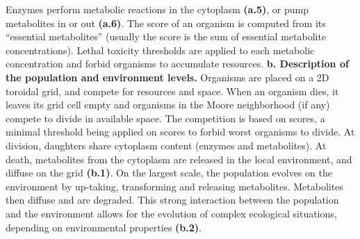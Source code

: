 \begin{figurehere}
{{Enzymes perform metabolic reactions in the cytoplasm \textbf{(a.5)}, or pump metabolites in or out \textbf{(a.6)}. The score of an organism is computed from its ``essential metabolites''
(usually the score is the sum of essential metabolite concentrations). Lethal toxicity thresholds are applied to each metabolic concentration and forbid organisms to accumulate resources. \textbf{b. Description of the population and environment levels.} Organisms are placed on a 2D toroidal grid, and compete for resources and space. When an organism dies, it leaves its grid cell empty and organisms in the Moore neighborhood (if any) compete to divide in available space. The competition is based on scores, a minimal threshold being applied on scores to forbid worst organisms to divide. At division, daughters share cytoplasm content (enzymes and metabolites). At death, metabolites from the cytoplasm are released in the local environment, and diffuse on the grid \textbf{(b.1)}. On the largest scale, the population evolves on the environment by up-taking, transforming and releasing metabolites. Metabolites then diffuse and are degraded. This strong interaction between the population and the environment allows for the evolution of complex ecological situations, depending on environmental properties \textbf{(b.2)}.}}
\label{general_algorithm}
\end{figurehere}


